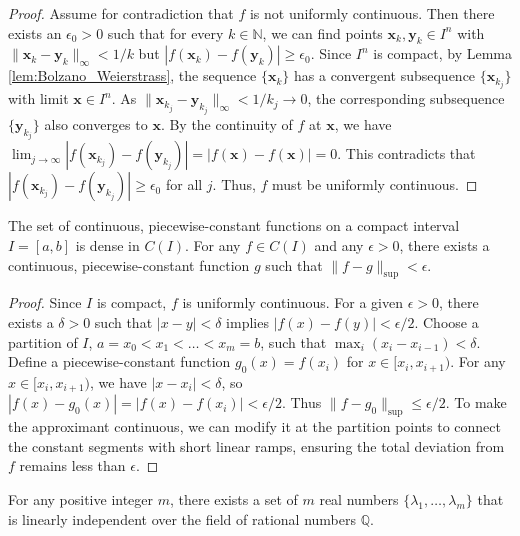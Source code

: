 \begin{proof}
    Assume for contradiction that $f$ is not uniformly continuous. Then there exists an $\epsilon_0 > 0$ such that for every $k \in \mathbb{N}$, we can find points $\mathbf{x}_k, \mathbf{y}_k \in I^n$ with $\|\mathbf{x}_k - \mathbf{y}_k\|_\infty < 1/k$ but $|f(\mathbf{x}_k) - f(\mathbf{y}_k)| \ge \epsilon_0$.
    Since $I^n$ is compact, by Lemma \ref{lem:Bolzano_Weierstrass}, the sequence $\{\mathbf{x}_k\}$ has a convergent subsequence $\{\mathbf{x}_{k_j}\}$ with limit $\mathbf{x} \in I^n$. As $\|\mathbf{x}_{k_j} - \mathbf{y}_{k_j}\|_\infty < 1/k_j \to 0$, the corresponding subsequence $\{\mathbf{y}_{k_j}\}$ also converges to $\mathbf{x}$.
    By the continuity of $f$ at $\mathbf{x}$, we have $\lim_{j\to\infty} |f(\mathbf{x}_{k_j}) - f(\mathbf{y}_{k_j})| = |f(\mathbf{x}) - f(\mathbf{x})| = 0$. This contradicts that $|f(\mathbf{x}_{k_j}) - f(\mathbf{y}_{k_j})| \ge \epsilon_0$ for all $j$. Thus, $f$ must be uniformly continuous.
\end{proof}

\begin{lemma}
    \label{lem:Piecewise_Constant_Approximation}
    The set of continuous, piecewise-constant functions on a compact interval $I = [a,b]$ is dense in $C(I)$. For any $f \in C(I)$ and any $\epsilon > 0$, there exists a continuous, piecewise-constant function $g$ such that $\|f - g\|_{\sup} < \epsilon$.
\end{lemma}

\begin{proof}
    Since $I$ is compact, $f$ is uniformly continuous. For a given $\epsilon > 0$, there exists a $\delta > 0$ such that $|x-y| < \delta$ implies $|f(x)-f(y)| < \epsilon/2$. Choose a partition of $I$, $a=x_0 < x_1 < \dots < x_m=b$, such that $\max_i(x_i - x_{i-1}) < \delta$. Define a piecewise-constant function $g_0(x) = f(x_i)$ for $x \in [x_i, x_{i+1})$. For any $x \in [x_i, x_{i+1})$, we have $|x - x_i| < \delta$, so $|f(x) - g_0(x)| = |f(x) - f(x_i)| < \epsilon/2$. Thus $\|f - g_0\|_{\sup} \le \epsilon/2$. To make the approximant continuous, we can modify it at the partition points to connect the constant segments with short linear ramps, ensuring the total deviation from $f$ remains less than $\epsilon$.
\end{proof}

\begin{lemma}
    \label{lem:Linear_Independence_Over_Rationals}
    For any positive integer $m$, there exists a set of $m$ real numbers $\{\lambda_1, \dots, \lambda_m\}$ that is linearly independent over the field of rational numbers $\mathbb{Q}$.
\end{lemma}

